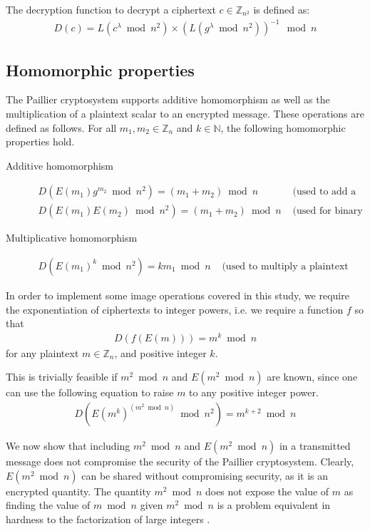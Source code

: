 The decryption function to decrypt a ciphertext $c \in \mathbb{Z}_{n^2}$ is defined as:
\begin{align*}
  D(c) = L(c^\lambda \bmod n^2) \times (L(g^\lambda \bmod n^2))^{-1} \mod n
\end{align*}

\subsection{Homomorphic properties}
The Paillier cryptosystem supports additive homomorphism as well as the multiplication of a plaintext scalar to an encrypted message. These operations are defined as follows.
For all $m_1,m_2 \in \mathbb{Z}_n$ and $k\in \mathbb{N}$, the following homomorphic properties hold.
\begin{description}
  \item[Additive homomorphism]
  \begin{align*}
    D(E(m_1)g^{m_2}\bmod n^2)=(m_1+m_2)\bmod n & \text{ (used to add a constant)}\\
    D(E(m_1)E(m_2)\bmod n^2)=(m_1+m_2)\bmod n & \text{ (used for binary addition)}
  \end{align*}
  \item[Multiplicative homomorphism]
  \begin{align*}
    D(E(m_1)^k\bmod n^2)= km_1\bmod n & \text{ (used to multiply a plaintext constant)}
  \end{align*}
\end{description}
In order to implement some image operations covered in this study, we require the exponentiation of ciphertexts to integer powers, i.e. we require a function $f$ so that
\begin{align*}
	D(f(E(m))) = m^k\bmod n
\end{align*}
for any plaintext $m \in \mathbb{Z}_n$, and positive integer $k$.

This is trivially feasible if $m^2 \bmod n$ and $E(m^2 \bmod n)$ are known, since one can use the following equation to raise $m$ to any positive integer power.
\begin{align*}
	D(E(m^k)^(m^2 \bmod n)\bmod n^2)= m^{k+2}\bmod n
\end{align*}

We now show that including $m^2 \bmod n$ and $E(m^2 \bmod n)$ in a transmitted message does not compromise the security of the Paillier cryptosystem. Clearly, $E(m^2 \bmod n)$ can be shared without compromising security, as it is an encrypted quantity. The quantity $m^2 \bmod n$ does not expose the value of $m$ as finding the value of $m \bmod n$ given $m^2 \bmod n$ is a problem equivalent in hardness to the factorization of large integers \cite{crandall_prime_2005}.

